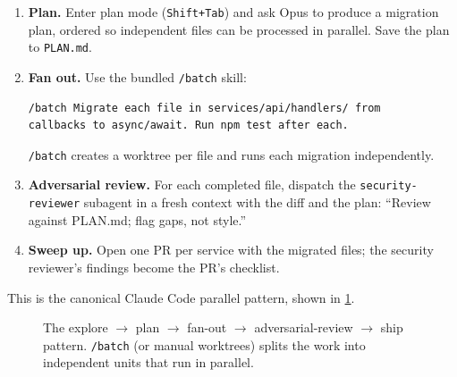 \begin{enumerate}
  \item \textbf{Plan.} Enter plan mode (\texttt{Shift+Tab}) and ask
        Opus to produce a migration plan, ordered so independent files
        can be processed in parallel. Save the plan to
        \texttt{PLAN.md}.
  \item \textbf{Fan out.} Use the bundled \texttt{/batch} skill:
\begin{verbatim}
/batch Migrate each file in services/api/handlers/ from
callbacks to async/await. Run npm test after each.
\end{verbatim}
        \texttt{/batch} creates a worktree per file and runs each
        migration independently.
  \item \textbf{Adversarial review.} For each completed file, dispatch
        the \texttt{security-reviewer} subagent in a fresh context with
        the diff and the plan: ``Review against PLAN.md; flag gaps,
        not style.''
  \item \textbf{Sweep up.} Open one PR per service with the migrated
        files; the security reviewer's findings become the PR's
        checklist.
\end{enumerate}

This is the canonical Claude Code parallel pattern, shown in
\cref{fig:parallel-pattern}.

\begin{figure}[ht]
\centering
{}
\caption{The explore $\to$ plan $\to$ fan-out $\to$ adversarial-review
$\to$ ship pattern. \texttt{/batch} (or manual worktrees) splits the
work into independent units that run in parallel.}
\label{fig:parallel-pattern}
\end{figure}

